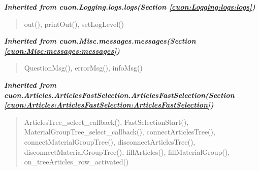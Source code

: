 \large{\textbf{\textit{Inherited from cuon.Logging.logs.logs\textit{(Section \ref{cuon:Logging:logs:logs})}}}}

\begin{quote}
out(), printOut(), setLogLevel()
\end{quote}

\large{\textbf{\textit{Inherited from cuon.Misc.messages.messages\textit{(Section \ref{cuon:Misc:messages:messages})}}}}

\begin{quote}
QuestionMsg(), errorMsg(), infoMsg()
\end{quote}

\large{\textbf{\textit{Inherited from cuon.Articles.ArticlesFastSelection.ArticlesFastSelection\textit{(Section \ref{cuon:Articles:ArticlesFastSelection:ArticlesFastSelection})}}}}

\begin{quote}
ArticlesTree\_select\_callback(), FastSelectionStart(), MaterialGroupTree\_select\_callback(), connectArticlesTree(), connectMaterialGroupTree(), disconnectArticlesTree(), disconnectMaterialGroupTree(), fillArticles(), fillMaterialGroup(), on\_treeArticles\_row\_activated()
\end{quote}
